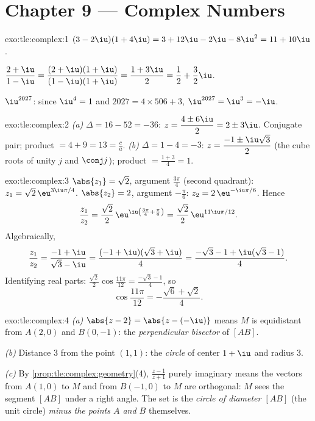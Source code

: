 \section*{Chapter 9 --- Complex Numbers}

\begin{solution}{exo:tle:complex:1}
$(3-2\iu)(1+4\iu) = 3 + 12\iu - 2\iu - 8\iu^2 = 11 + 10\iu$.

$\dfrac{2+\iu}{1-\iu} = \dfrac{(2+\iu)(1+\iu)}{(1-\iu)(1+\iu)}
= \dfrac{1 + 3\iu}{2} = \dfrac12 + \dfrac32\iu$.

$\iu^{2027}$: since $\iu^4 = 1$ and $2027 = 4 \times 506 + 3$,
$\iu^{2027} = \iu^3 = -\iu$.
\end{solution}

\begin{solution}{exo:tle:complex:2}
\emph{(a)} $\Delta = 16 - 52 = -36$:
$z = \dfrac{4 \pm 6\iu}{2} = 2 \pm 3\iu$. Conjugate pair; product
$= 4 + 9 = 13 = \frac ca$. \emph{(b)} $\Delta = 1 - 4 = -3$:
$z = \dfrac{-1 \pm \iu\sqrt3}{2}$ (the cube roots of unity $j$ and
$\conj j$); product $= \frac{1 + 3}{4} = 1$.
\end{solution}

\begin{solution}{exo:tle:complex:3}
$\abs{z_1} = \sqrt2$, argument $\frac{3\pi}{4}$ (second quadrant):
$z_1 = \sqrt2\,\eu^{3\iu\pi/4}$.
$\abs{z_2} = 2$, argument $-\frac\pi6$:
$z_2 = 2\,\eu^{-\iu\pi/6}$. Hence
\[
\frac{z_1}{z_2} = \frac{\sqrt2}{2}\,\eu^{\iu\left(\frac{3\pi}{4} + \frac{\pi}{6}\right)}
= \frac{\sqrt2}{2}\,\eu^{11\iu\pi/12}.
\]
Algebraically,
\[
\frac{z_1}{z_2} = \frac{-1+\iu}{\sqrt3 - \iu}
= \frac{(-1+\iu)(\sqrt3+\iu)}{4}
= \frac{-\sqrt3 - 1 + \iu(\sqrt3 - 1)}{4}.
\]
Identifying real parts:
$\frac{\sqrt2}{2}\cos\frac{11\pi}{12} = \frac{-\sqrt3-1}{4}$, so
\[
\cos\frac{11\pi}{12} = -\frac{\sqrt6 + \sqrt2}{4}.
\]
\end{solution}

\begin{solution}{exo:tle:complex:4}
\emph{(a)} $\abs{z - 2} = \abs{z - (-\iu)}$ means $M$ is equidistant from
$A(2, 0)$ and $B(0, -1)$: the \emph{perpendicular bisector} of $[AB]$.

\emph{(b)} Distance $3$ from the point $(1,1)$: the \emph{circle} of center
$1 + \iu$ and radius $3$.

\emph{(c)} By \cref{prop:tle:complex:geometry}(4), $\frac{z-1}{z+1}$ purely
imaginary means the vectors from $A(1,0)$ to $M$ and from $B(-1,0)$ to $M$
are orthogonal: $M$ sees the segment $[AB]$ under a right angle. The set is
the \emph{circle of diameter $[AB]$} (the unit circle) \emph{minus the
points $A$ and $B$} themselves.
\end{solution}

